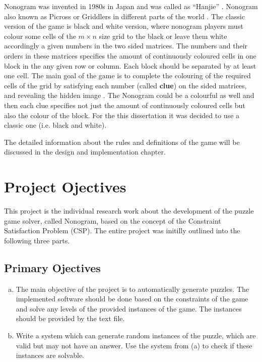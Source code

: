 Nonogram was invented in 1980s in Japan and was called as “Hanjie” \cite{nonogram_reinforcement}. Nonogram also known as Picross or Griddlers in different parts of the world \cite{nonogram_reinforcement,nonogram_good}. The classic version of the game is black and white version, where nonogram players must colour some cells of the $m\times n$ size grid to the black or leave them white accordingly a given numbers in the two sided matrices. The numbers and their orders in these matrices specifies the amount of continuously coloured cells in one block in the any given row or column. Each block should be separated by at least one cell.
The main goal of the game is to complete the colouring of the required cells of the grid by satisfying each number (called \textbf{clue}) on the sided matrices, and revealing the hidden image \cite{nonogram_good}. The Nonogram could be a colourful as well and then each clue specifies not just the amount of continuously coloured cells but also the colour of the block. For the this dissertation it was decided to use a classic one (i.e. black and white).

The detailed information about the rules and definitions of the game will be discussed in the design and implementation chapter.



\section{Project Ojectives}
\label{subsec:objectives}
This project is the individual research work about the development of the puzzle game solver, called Nonogram, based on the concept of the Constraint Satisfaction Problem (CSP).
The entire project was initilly outlined into the following three parts.

\subsection{Primary Ojectives}
\label{subsec:primary_obj}
\begin{enumerate}[(a)]
    \item The main objective of the project is to automatically generate puzzles. The implemented software should be done based on the constraints of the game and solve any levels of the provided instances of the game. The instances should be provided by the text file.
    \item Write a system which can generate random instances of the puzzle, which are valid but may not have an answer. Use the system from (a) to check if these instances are solvable.
\end{enumerate}

